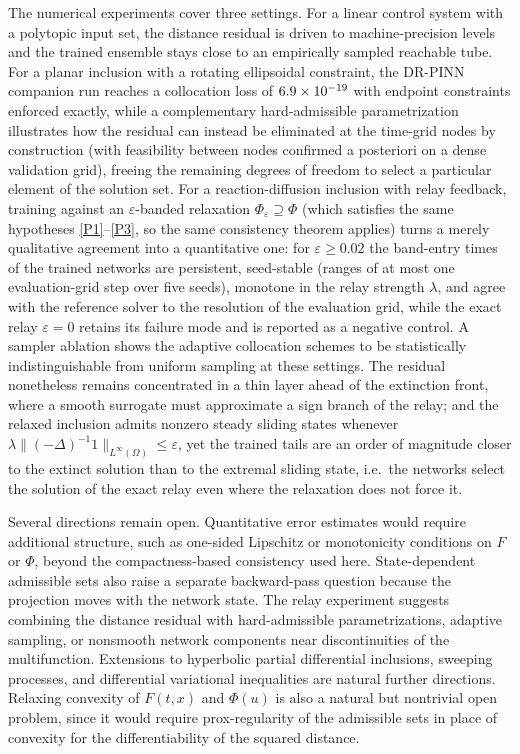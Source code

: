 \documentclass[11pt]{elsarticle}
\theoremstyle{definition}
\theoremstyle{remark}
\numberwithin{equation}{section}
\begin{document}
The numerical experiments cover three settings. For a
linear control system with a polytopic input set, the distance residual
is driven to machine-precision levels and the trained ensemble stays
close to an empirically sampled reachable tube. For a planar inclusion
with a rotating ellipsoidal constraint, the DR-PINN companion run reaches
a collocation loss of $6.9\times 10^{-19}$ with endpoint constraints enforced
exactly, while a complementary hard-admissible parametrization
illustrates how the residual can instead be eliminated at the time-grid
nodes by construction (with feasibility between nodes confirmed a
posteriori on a dense validation grid), freeing the remaining degrees of freedom to
select a particular element of the solution set. For a reaction-diffusion
inclusion with relay feedback, training against an $\varepsilon$-banded
relaxation $\Phi_\varepsilon\supseteq\Phi$ (which satisfies the same
hypotheses \ref{P1}--\ref{P3}, so the same consistency theorem applies) turns
a merely qualitative agreement into a quantitative one: for
$\varepsilon\ge0.02$ the band-entry times of the trained networks are
persistent, seed-stable (ranges of at most one evaluation-grid step over
five seeds), monotone in the relay strength $\lambda$, and agree with the
reference solver to the resolution of the evaluation grid, while the
exact relay $\varepsilon=0$ retains its failure mode and is reported as a
negative control. A sampler ablation shows the adaptive collocation
schemes to be statistically indistinguishable from uniform sampling at
these settings. The residual nonetheless remains concentrated in a thin
layer ahead of the extinction front, where a smooth surrogate must
approximate a sign branch of the relay; and the relaxed inclusion admits
nonzero steady sliding states whenever
$\lambda\|(-\Delta)^{-1}1\|_{L^\infty(\Omega)}\le\varepsilon$, yet the
trained tails are an order of magnitude closer to the extinct solution
than to the extremal sliding state, i.e.\ the networks select the
solution of the exact relay even where the relaxation does not force it.

Several directions remain open. Quantitative error estimates would require
additional structure, such as one-sided Lipschitz or monotonicity
conditions on $F$ or $\Phi$, beyond the compactness-based consistency used
here. State-dependent admissible sets also raise a separate backward-pass
question because the projection moves with the network state. The relay
experiment suggests combining the distance residual with hard-admissible
parametrizations, adaptive sampling, or nonsmooth network components near
discontinuities of the multifunction. Extensions to hyperbolic partial
differential inclusions, sweeping processes, and differential variational
inequalities are natural further directions.
%
Relaxing convexity of $F(t,x)$ and $\Phi(u)$ is also a natural but nontrivial open problem, since it would require prox-regularity of the admissible sets in place of convexity for the differentiability of the squared distance.
\end{document}
